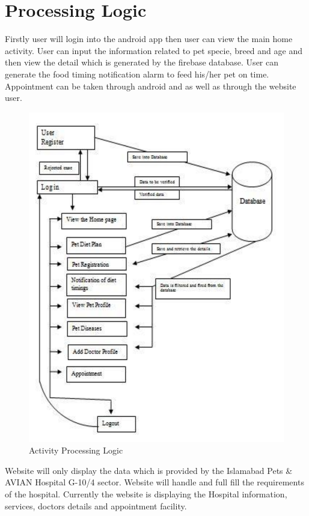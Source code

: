 \section{Processing Logic}
Firstly user will login into the android app then user can view the main home activity. User can input the information related to pet specie, breed and age and then view the detail which is generated by the firebase database. User can generate the food timing notification alarm to feed his/her pet on time. Appointment can be taken through android and as well as through the website user.
\begin{figure}[H]
\centering
  \includegraphics[scale=0.5]{fivethree}
  \caption{Activity Processing Logic}
\end{figure}
Website will only display the data which is provided by the Islamabad Pets & AVIAN Hospital G-10/4 sector. Website will handle and full fill the requirements of the hospital. Currently the website is displaying the Hospital information, services, doctors details and appointment facility.

